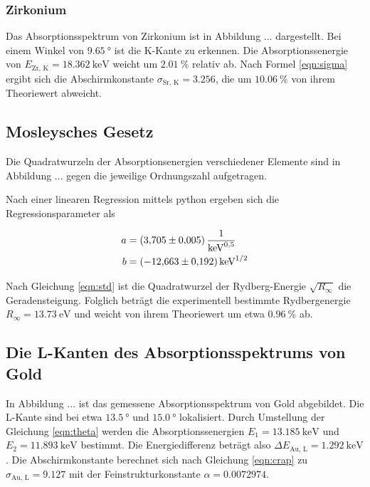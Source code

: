 \subsubsection{Zirkonium}

Das Absorptionsspektrum von Zirkonium ist in Abbildung ... dargestellt.
Bei einem Winkel von $\SI{9,65}{\degree}$ ist die K-Kante zu erkennen. Die
Absorptionssenergie von $E_\text{Zr, K} = \SI{18.362}{\kilo\eV}$ weicht
um $\SI{2.01}{\percent}$ relativ ab. Nach Formel \eqref{eqn:sigma} ergibt 
sich die Abschirmkonstante $\sigma_\text{Sr, K} = 3.256$, die um 
$\SI{10.06}{\percent}$ von ihrem Theoriewert abweicht.

\subsection{Mosleysches Gesetz}

Die Quadratwurzeln der Absorptionsenergien verschiedener Elemente
sind in Abbildung ... gegen die jeweilige Ordnungszahl aufgetragen.

Nach einer linearen Regression mittels python ergeben sich die
Regressionsparameter als

\begin{align*}
  a &= \SI{3.705 +- 0.005}{\per \kilo \eV \tothe{1/2}} \\
  b &= \SI{-12.663 +- 0.192}{\kilo \eV \tothe{1/2}}
\end{align*}

Nach Gleichung \eqref{eqn:std} ist die Quadratwurzel der Rydberg-Energie
$\sqrt{R_\infty}$ die Geradensteigung. Folglich beträgt die experimentell
bestimmte Rydbergenergie $R_\infty = \SI{13.73}{\eV}$ und weicht von ihrem
Theoriewert um etwa $\SI{0.96}{\percent}$ ab.

\subsection{Die L-Kanten des Absorptionsspektrums von Gold}

In Abbildung ... ist das gemessene Absorptionsspektrum von Gold abgebildet.
Die L-Kante sind bei etwa $\SI{13.5}{\degree}$ und $\SI{15.0}{\degree}$ lokalisiert.
Durch Umstellung der Gleichung \eqref{eqn:theta} werden die Absorptionssenergien 
$ E_1 = \SI{13.185}{\kilo\eV}$ und $ E_2 = \SI{11.893}{\kilo\eV}$ bestimmt.
Die Energiedifferenz beträgt also $\Delta E_\text{Au, L} = \SI{1.292}{\kilo\eV}$.
Die Abschirmkonstante berechnet sich nach Gleichung \eqref{eqn:crap} zu 
$\sigma_\text{Au, L} = 9.127$ mit der Feinstrukturkonstante
$\alpha = 0.0072974$.








